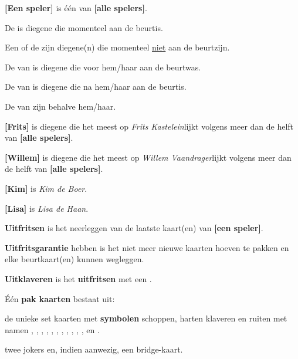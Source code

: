 \item \textbf{[Een speler]} is één van \textbf{[alle spelers]}. 

\item De \huidigeSpeler is diegene die momenteel aan de beurt\footnotemark[1] is.  

\item Een \andereSpeler of de \andereSpelers zijn diegene(n) die momenteel \ul{niet} aan de beurt\footnotemark[1] zijn. 

\item De \vorigeSpeler van \eenSpeler is diegene die voor hem/haar aan de beurt\footnotemark[1] was. 

\item De \volgendeSpeler van \eenSpeler is diegene die na hem/haar aan de beurt\footnotemark[1] is. 

\item De \medeSpelers van \eenSpeler zijn \alleSpelers behalve hem/haar.

\item \textbf{[Frits]} is diegene die het meest op \textit{Frits Kastelein}\footnotemark[2] lijkt volgens meer dan de helft van \textbf{[alle spelers]\footnotemark[3]}.

\item \textbf{[Willem]} is diegene die het meest op \textit{Willem Vaandrager}\footnotemark[2] lijkt volgens meer dan de helft van \textbf{[alle spelers]\footnotemark[3]}.

\item \label{item:kim}\textbf{[Kim]} is \textit{Kim de Boer}.

\item \label{item:lisa}\textbf{[Lisa]} is \textit{Lisa de Haan}.

\item \label{item:uitfritsen} \textbf{Uitfritsen} is het neerleggen van de laatste kaart(en) van \textbf{[een speler]}.

\item  \label{item:uitfritsgarantie} \textbf{Uitfritsgarantie} hebben is het niet meer nieuwe kaarten hoeven te pakken en elke beurt\footnotemark[1] kaart(en) kunnen wegleggen.

\item \label{item:uitklaver} \textbf{Uitklaveren} is het \textbf{uitfritsen} met een \footnotemark[4].

\item \label{item:kaarten} \'E\'en \textbf{pak kaarten} bestaat uit: 
    \puntLijst{}
        \item de unieke set kaarten met \textbf{symbolen} schoppen, harten klaveren en ruiten met namen , , , , , , , , , , ,  en .
        \item twee jokers en, indien aanwezig, een bridge-kaart.
    \eindPuntLijst{}

